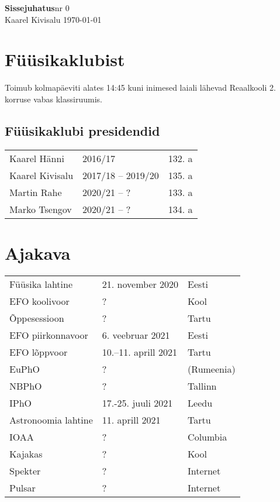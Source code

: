 \documentclass[a4paper,11pt,twocolumn]{article}
\begin{document}
{\huge \textbf{Sissejuhatus}\hfill \normalsize {nr 0}} \\
{Kaarel Kivisalu \hfill \today}

\section{Füüsikaklubist}

Toimub kolmapäeviti alates 14:45 kuni inimesed laiali lähevad Reaalkooli 2. korruse vabas klassiruumis.

\subsection{Füüsikaklubi presidendid}
\begin{tabular}{l l l}
    Kaarel Hänni & 2016/17 & 132. a \\
    Kaarel Kivisalu & 2017/18 -- 2019/20 & 135. a \\
    Martin Rahe & 2020/21 -- ? & 133. a \\
    Marko Tsengov & 2020/21 -- ? & 134. a \\
\end{tabular}

\section{Ajakava}

\begin{tabular}{l l l}
    Füüsika lahtine & 21. november 2020 & Eesti\\
    EFO koolivoor & ? & Kool\\
    Õppesessioon & ? & Tartu \\
    EFO piirkonnavoor & 6. veebruar 2021 & Eesti\\
    EFO lõppvoor & 10.--11. aprill 2021 & Tartu\\
    EuPhO & ? & (Rumeenia)\\
    NBPhO & ? & Tallinn\\
    IPhO & 17.-25. juuli 2021 & Leedu\\
    Astronoomia lahtine & 11. aprill 2021 & Tartu\\
    IOAA & ? & Columbia\\
    Kajakas & ? & Kool\\
    Spekter & ? & Internet\\
    Pulsar & ? & Internet\\
\end{tabular}
\end{document}
